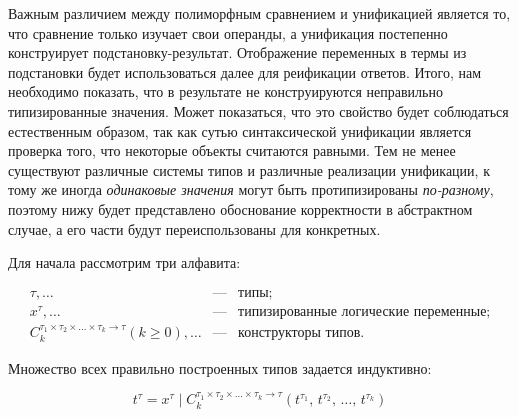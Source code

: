 Важным различием между полиморфным сравнением и унификацией является то, что сравнение только изучает свои операнды,
а унификация постепенно конструирует подстановку-результат.
Отображение переменных в термы из подстановки будет использоваться далее для реификации ответов.
Итого, нам необходимо показать, что в результате не конструируются неправильно типизированные значения.
Может показаться, что это свойство будет соблюдаться естественным образом, так как сутью синтаксической унификации является проверка того, что некоторые объекты считаются равными.
Тем не менее существуют различные системы типов и различные реализации унификации, к тому же иногда \emph{одинаковые значения} могут быть протипизированы \emph{по-разному}, поэтому нижу будет представлено обоснование корректности в абстрактном случае, а его части будут переиспользованы для конкретных.


Для начала рассмотрим три алфавита:

\[
\begin{array}{rcl}
  \tau,\dots&\text{---}&\mbox{типы;}\\
  x^\tau,\dots&\text{---}&\mbox{типизированные логические переменные;}\\
  C_k^{\tau_1\times\tau_2\times\dots\times\tau_k\to\tau} (k\ge 0),\dots&\text{---}&\mbox{конструкторы типов.}
\end{array}
\]

Множество всех правильно построенных типов задается индуктивно:

\[
t^\tau=x^\tau\mid C_k^{\tau_1\times\tau_2\times\dots\times\tau_k\to\tau}(t^{\tau_1},\,t^{\tau_2},\,\dots,\,t^{\tau_k})
\]

